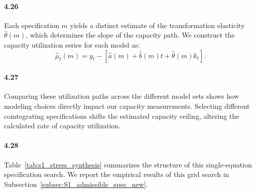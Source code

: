 \paragraph{4.26}
Each specification $m$ yields a distinct estimate of the transformation elasticity $\hat{\theta}(m)$, which determines the slope of the capacity path. We construct the capacity utilization series for each model as:
\begin{equation}
\hat{\mu}_t(m) = y_t - [\hat{a}(m) + \hat{b}(m)t + \hat{\theta}(m)k_t].
\label{eq:mu_hat_m}
\end{equation}

\paragraph{4.27}
Comparing these utilization paths across the different model sets shows how modeling choices directly impact our capacity measurements. Selecting different cointegrating specifications shifts the estimated capacity ceiling, altering the calculated rate of capacity utilization.

\paragraph{4.28}
Table~\ref{tab:s1_stress_synthesis} summarizes the structure of this single-equation specification search. We report the empirical results of this grid search in Subsection~\ref{subsec:S1_admissible_spec_new}.


